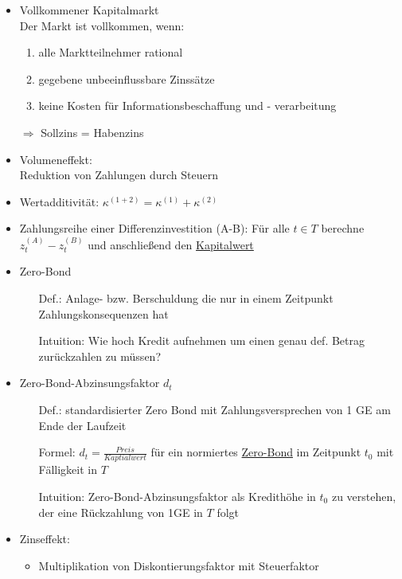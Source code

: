 \begin{itemize}
\begin{itemize}
			\end{itemize}  
		\item Vollkommener Kapitalmarkt \label{VollkommenerKapitalmarkt} \\
			Der Markt ist vollkommen, wenn:
			\begin{enumerate}
				\item alle Marktteilnehmer rational
				\item gegebene unbeeinflussbare Zinssätze
				\item keine Kosten für Informationsbeschaffung und - verarbeitung
			\end{enumerate}
			$\Rightarrow$ Sollzins = Habenzins
		\item Volumeneffekt: \label{Volumeneffekt}\\
			Reduktion von Zahlungen durch Steuern
		\item Wertadditivität: \label{Wertadditivitaet}
			$\kappa^{(1+2)}=\kappa^{(1)}+\kappa^{(2)} $
		\item Zahlungsreihe einer Differenzinvestition (A-B): Für alle $t\in T$ berechne $z_t^{(A)}-z_t^{(B)}$ und anschließend den \hyperref[Kapitalwert]{Kapitalwert}
		\item Zero-Bond \label{ZeroBond}
			\begin{itemize}
				\setlength{\itemindent}{1cm}
				\item[Def.:] Anlage- bzw. Berschuldung die nur in einem Zeitpunkt Zahlungskonsequenzen hat
				\item[Intuition:] Wie hoch Kredit aufnehmen um einen genau def. Betrag zurückzahlen zu müssen?
			\end{itemize}
		\item Zero-Bond-Abzinsungsfaktor $d_t$ \label{ZeroBondAbzinsungsfaktor}
			\begin{itemize}
				\setlength{\itemindent}{1cm}
				\item[Def.:] standardisierter Zero Bond mit Zahlungsversprechen von 1 GE am Ende der Laufzeit
				\item[Formel:] $d_t = \frac{Preis}{Kaptialwert}$ für ein normiertes \hyperref[ZeroBond]{Zero-Bond} im Zeitpunkt $t_0$ mit Fälligkeit in $T$
				\item[Intuition:] Zero-Bond-Abzinsungsfaktor als Kredithöhe in $t_0$ zu verstehen, der eine Rückzahlung von 1GE in $T$ folgt
			\end{itemize}
		\item Zinseffekt: \label{Zinseffekt}
			\begin{itemize}
				\item Multiplikation von Diskontierungsfaktor mit Steuerfaktor

\end{itemize}
\end{itemize}
